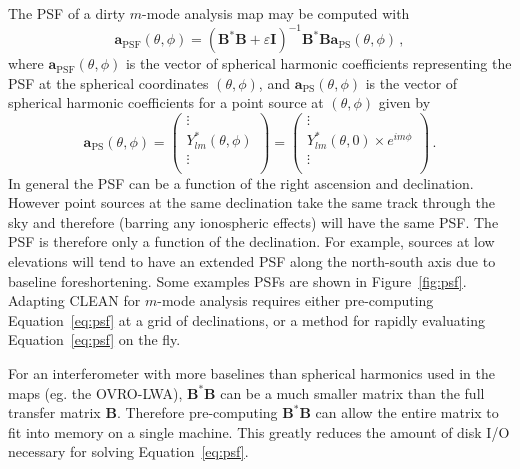 \documentclass[twocolumn]{aastex61}
\renewcommand{\b}{\pmb}
\begin{document}
The PSF of a dirty $m$-mode analysis map may be computed with
\begin{equation}\label{eq:psf}
    \b a_\text{PSF}(\theta, \phi)
        = (\b B^*\b B + \varepsilon\b I)^{-1}\b B^*\b B\b a_\text{PS}(\theta, \phi)\,,
\end{equation}
where $\b a_\text{PSF}(\theta, \phi)$ is the vector of spherical harmonic coefficients representing
the PSF at the spherical coordinates $(\theta, \phi)$, and $\b a_\text{PS}(\theta, \phi)$ is the
vector of spherical harmonic coefficients for a point source at $(\theta, \phi)$ given by
\begin{equation}
    \b a_\text{PS}(\theta, \phi) = \begin{pmatrix}
        \vdots \\
        Y_{lm}^*(\theta, \phi) \\
        \vdots \\
    \end{pmatrix}
    = \begin{pmatrix}
        \vdots \\
        Y_{lm}^*(\theta, 0)\times e^{im\phi} \\
        \vdots \\
    \end{pmatrix} \,.
\end{equation}
In general the PSF can be a function of the right ascension and declination. However point sources
at the same declination take the same track through the sky and therefore (barring any ionospheric
effects) will have the same PSF. The PSF is therefore only a function of the declination. For
example, sources at low elevations will tend to have an extended PSF along the north-south axis due
to baseline foreshortening. Some examples PSFs are shown in Figure~\ref{fig:psf}.  Adapting CLEAN
for $m$-mode analysis requires either pre-computing Equation~\ref{eq:psf} at a grid of declinations,
or a method for rapidly evaluating Equation~\ref{eq:psf} on the fly.


For an interferometer with more baselines than spherical harmonics used in the maps (eg. the
OVRO-LWA), $\b B^*\b B$ can be a much smaller matrix than the full transfer matrix $\b B$. Therefore
pre-computing $\b B^*\b B$ can allow the entire matrix to fit into memory on a single machine. This
greatly reduces the amount of disk I/O necessary for solving Equation~\ref{eq:psf}.
\end{document}
